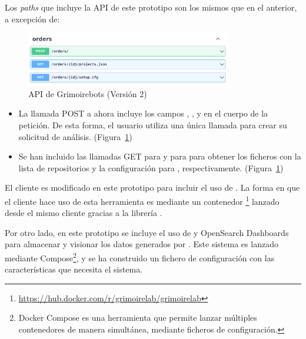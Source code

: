 Los \emph{paths} que incluye la API de este prototipo son los mismos que en el anterior, a excepción de:

\begin{figure}[ht]
    \centering
    \includegraphics[width=0.8\textwidth]{Figures/grimoirebots_ii_api}
    \decoRule
    \caption[Grimoirebots II (API)]{API de Grimoirebots (Versión 2)}
    \label{fig:grimoirebots_ii_api}
\end{figure}

\begin{itemize}
    \item La llamada POST a  ahora incluye los campos , , y  en el cuerpo de la petición. De esta forma, el usuario utiliza una única llamada para crear su solicitud de análisis. (Figura~\ref{fig:grimoirebots_ii_api})
    \item Se han incluido las llamadas GET para  y para  para obtener los ficheros con la lista de repositorios y la configuración para , respectivamente. (Figura~\ref{fig:grimoirebots_ii_api})
\end{itemize}

El cliente es modificado en este prototipo para incluir el uso de . La forma en que el cliente hace uso de esta herramienta es mediante un contenedor \footnote{\url{https://hub.docker.com/r/grimoirelab/grimoirelab}} lanzado desde el mismo cliente gracias a la librería .

Por otro lado, en este prototipo se incluye el uso de  y OpenSearch Dashboards para almacenar y visionar los datos generados por . Este sistema es lanzado mediante  Compose\footnote{Docker Compose es una herramienta que permite lanzar múltiples contenedores de manera simultánea, mediante ficheros de configuración.}, y se ha construido un fichero de configuración con las características que necesita el sistema.

